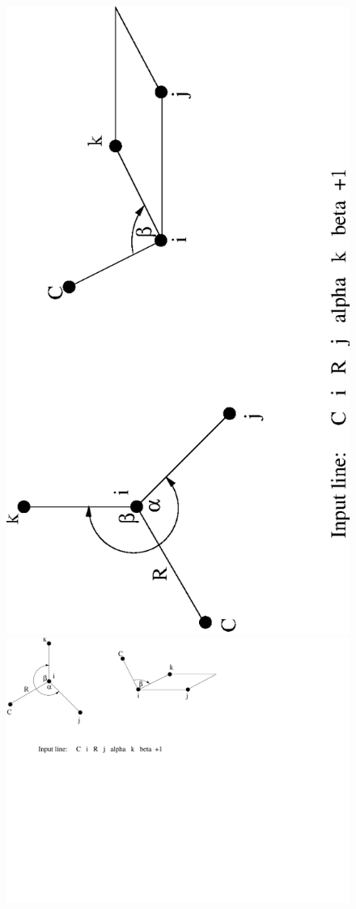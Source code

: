 \begin{figure}[htbp]
\centering
\begin{latexonly}
\ifx\pdfoutput\undefined
\includegraphics[angle=270,width=6in]{zmat2.eps}
\else
\includegraphics[angle=270,width=6in]{zmat2.pdf}

\end{latexonly}
\end{figure}
